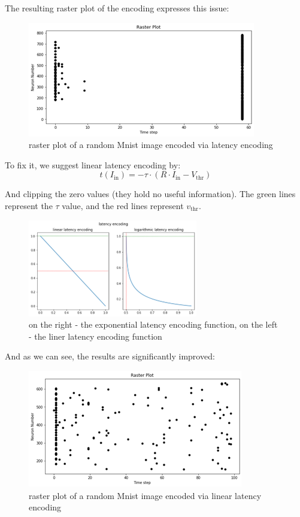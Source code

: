 The resulting raster plot of the encoding expresses this issue:

\begin{figure}[H]
    \centering
    \includegraphics[width=0.5\linewidth]{methods/spike-encoding/graphs/latency-encoding-raster.png}
    \caption{raster plot of a random Mnist image encoded via latency encoding}
    \label{fig:latency-encoding-raster}
\end{figure}

To fix it, we suggest linear latency encoding by:
\begin{equation}
t(I_{\text{in}}) = -\tau \cdot \left(R \cdot I_{\text{in}} - V_{\text{thr}}\right)
\end{equation}

And clipping the zero values (they hold no useful information). The green lines represent the $\tau$ value, and the red lines represent $v_{\text{thr}}$.

\begin{figure}[H]
    \centering
    \includegraphics[width=0.5\linewidth]{methods/spike-encoding/graphs/exp-to-linear.png}
    \caption{on the right - the exponential latency encoding function, on the left - the liner latency encoding function}
    \label{fig:latency-exp-vs-lin}
\end{figure}

And as we can see, the results are significantly improved:

\begin{figure}[H]
    \centering
    \includegraphics[width=0.5\linewidth]{methods/spike-encoding/graphs/latency-encoding-raster-linear.png}
    \caption{ raster plot of a random Mnist image encoded via linear latency encoding}
    \label{fig:latency-encoding-raster-linear}
\end{figure}
